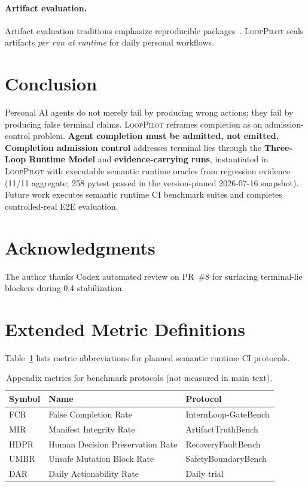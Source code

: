 \documentclass[11pt]{article}
\newcommand{\looppilot}{\textsc{LoopPilot}}
\begin{document}
\paragraph{Artifact evaluation.}
Artifact evaluation traditions emphasize reproducible packages~\cite{icse2019repeatability}.
\looppilot{} seals artifacts \emph{per run at runtime} for daily personal workflows.

\section{Conclusion}
\label{sec:conclusion}

Personal AI agents do not merely fail by producing wrong actions; they fail by producing false terminal claims.
\looppilot{} reframes completion as an admission-control problem.
\textbf{Agent completion must be admitted, not emitted.}
\textbf{Completion admission control} addresses terminal lies through the \textbf{Three-Loop Runtime Model} and \textbf{evidence-carrying runs}, instantiated in \looppilot{} with executable semantic runtime oracles from regression evidence (11/11 aggregate; 258 pytest passed in the version-pinned 2026-07-16 snapshot).
Future work executes semantic runtime CI benchmark suites and completes controlled-real E2E evaluation.

\section*{Acknowledgments}
The author thanks Codex automated review on PR~\#8 for surfacing terminal-lie blockers during 0.4 stabilization.




\appendix
\section{Extended Metric Definitions}
\label{app:metrics}

Table~\ref{tab:app-metrics} lists metric abbreviations for planned semantic runtime CI protocols.

\begin{table}[h]
  \centering
  \caption{Appendix metrics for benchmark protocols (not measured in main text).}
  \label{tab:app-metrics}
  \small
  \begin{tabular}{@{}lll@{}}
    \toprule
    \textbf{Symbol} & \textbf{Name} & \textbf{Protocol} \\
    \midrule
    FCR & False Completion Rate & InternLoop-GateBench \\
    MIR & Manifest Integrity Rate & ArtifactTruthBench \\
    HDPR & Human Decision Preservation Rate & RecoveryFaultBench \\
    UMBR & Unsafe Mutation Block Rate & SafetyBoundaryBench \\
    DAR & Daily Actionability Rate & Daily trial \\
    \bottomrule
  \end{tabular}
\end{table}
\end{document}
